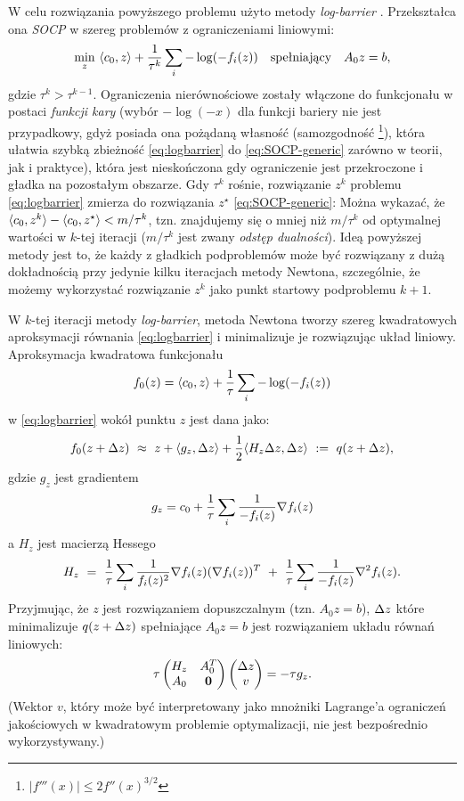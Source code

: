 W celu rozwiązania powyższego problemu użyto metody \textit{log-barrier} \cite{Boyd2004}. Przekształca ona \textit{SOCP} w szereg problemów z ograniczeniami liniowymi:
\begin{equation}
\label{eq:logbarrier} 
\min_z ~ \langle c_0,z\rangle + \frac{1}{\tau^k} \sum_{i}
-\log(-f_i(z)) \quad\text{spełniający}\quad A_0 z=b,
\end{equation}
gdzie $\tau^k > \tau^{k-1}$. Ograniczenia nierównościowe zostały włączone do funkcjonału w postaci \textit{funkcji kary} (wybór $-\log(-x)$ dla funkcji bariery nie jest przypadkowy, gdyż posiada ona pożądaną własność (samozgodność \footnote{$|f'''(x)| \le 2f''(x)^{3/2}$}), która ułatwia szybką zbieżność \eqref{eq:logbarrier} do \eqref{eq:SOCP-generic} zarówno w teorii, jak i praktyce), która jest nieskończona gdy ograniczenie jest przekroczone i gładka na pozostałym obszarze.   Gdy $\tau^k$ rośnie, rozwiązanie $z^k$ problemu \eqref{eq:logbarrier} zmierza do rozwiązania $z^\star$  \eqref{eq:SOCP-generic}: 
Można wykazać, że $\langle c_0,z^k\rangle - \langle c_0,z^\star\rangle < m/\tau^k$, tzn. znajdujemy się o mniej niż $m/\tau^k$ od optymalnej wartości w $k$-tej iteracji ($m/\tau^k$ jest zwany {\em odstęp dualności}).
Ideą powyższej metody jest to, że każdy z gładkich podproblemów może być rozwiązany z dużą dokładnością przy jedynie kilku iteracjach metody Newtona, szczególnie, że możemy wykorzystać rozwiązanie $z^k$ jako punkt startowy podproblemu $k+1$.

W $k$-tej iteracji metody \textit{log-barrier}, metoda Newtona tworzy szereg kwadratowych aproksymacji równania \eqref{eq:logbarrier} i minimalizuje je rozwiązując układ liniowy. Aproksymacja kwadratowa funkcjonału
\[
f_0(z) = \langle c_0,z\rangle + \frac{1}{\tau}\sum_i -\log(-f_i(z))
\]
w \eqref{eq:logbarrier} wokół punktu $z$ jest dana jako:
\[
f_0(z+\Delta z) ~\approx~ z + \langle g_z,\Delta z\rangle + \frac{1}{2}\langle H_z \Delta z,\Delta z\rangle ~:=~ q(z+\Delta z),
\]
gdzie $g_z$ jest gradientem
\[
g_z = c_0 + \frac{1}{\tau}\sum_i \frac{1}{-f_i(z)}\nabla f_i(z)
\]
a $H_z$ jest macierzą Hessego
\[
H_z ~=~ \frac{1}{\tau}\sum_i \frac{1}{f_i(z)^2} \nabla f_i(z) (\nabla f_i(z))^T ~+ ~
\frac{1}{\tau}\sum_i \frac{1}{-f_i(z)}\nabla^2 f_i(z).
\]
Przyjmując, że $z$ jest rozwiązaniem dopuszczalnym (tzn. $A_0 z=b$),  $\Delta z$ które minimalizuje $q(z+\Delta z)$ spełniające $A_0 z=b$ jest rozwiązaniem układu równań liniowych:
\begin{equation}
\label{eq:lbnewton}
\tau \left(\begin{matrix} H_z & A_0^T \\ A_0 & \mathbf{0} \end{matrix}\right) \left(\begin{matrix} \Delta z \\ v \end{matrix}\right)= -\tau g_z.
\end{equation}
(Wektor $v$, który może być interpretowany jako mnożniki Lagrange'a ograniczeń jakościowych w kwadratowym problemie optymalizacji, nie jest bezpośrednio wykorzystywany.)

